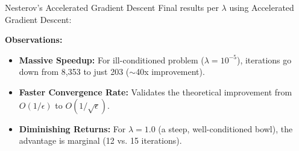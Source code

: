 \documentclass[10pt]{beamer}
\begin{document}
\begin{frame}{Nesterov's Accelerated Gradient Descent}
    \small
    Final results per $\lambda$ using Accelerated Gradient Descent:

    \vspace{0.4cm}
    \begin{table}[]
        \centering
    \end{table}

    \vspace{0.4cm}
    \textbf{Observations:}
    \begin{itemize}
        \item \textbf{Massive Speedup:} For ill-conditioned problem ($\lambda = 10^{-5}$), iterations go down from 8,353 to just 203 ($\sim$40x improvement).
        \item \textbf{Faster Convergence Rate:} Validates the theoretical improvement from $O(1/\epsilon)$ to $O(1/\sqrt{\epsilon})$.
        \item \textbf{Diminishing Returns:} For $\lambda = 1.0$ (a steep, well-conditioned bowl), the advantage is marginal (12 vs. 15 iterations).
    \end{itemize}
\end{frame}
\end{document}
